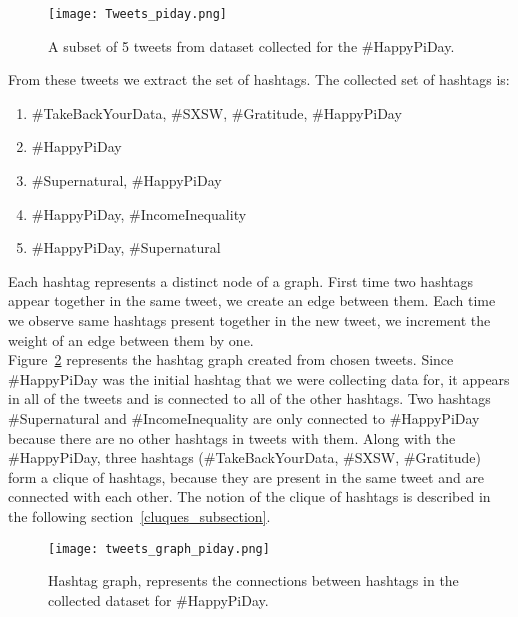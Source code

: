 \documentclass[journal, a4paper, 12pt]{article}
\begin{document}
  \begin{figure}[!hbt]
            \begin{center}
            \texttt{[image: Tweets\_piday.png]}
            \caption{A subset of 5 tweets from dataset collected for the \#HappyPiDay.}
            \label{fig:tweets_piday}
            \end{center}
      \end{figure}
    
From these tweets we extract the set of hashtags. The collected set of hashtags is:

\begin{enumerate}
\item \#TakeBackYourData, \#SXSW, \#Gratitude, \#HappyPiDay
\item \#HappyPiDay
\item \#Supernatural, \#HappyPiDay
\item \#HappyPiDay, \#IncomeInequality
\item \#HappyPiDay, \#Supernatural
\end{enumerate}


Each hashtag represents a distinct node of a graph. First time two hashtags appear together in the same tweet, we create an edge between them. Each time we observe same hashtags present together in the new tweet, we increment the weight of an edge between them by one.
\\

Figure~\ref{fig:tweets_graph_piday.png} represents the hashtag graph created from chosen tweets. Since \#HappyPiDay was the initial hashtag that we were collecting data for, it appears in all of the tweets and is connected to all of the other hashtags. Two hashtags \#Supernatural and \#IncomeInequality are only connected to \#HappyPiDay because there are no other hashtags in tweets with them. Along with the \#HappyPiDay, three hashtags (\#TakeBackYourData, \#SXSW, \#Gratitude) form a clique of hashtags, because they are present in the same tweet and are connected with each other. The notion of the clique of hashtags is described in the following section~\ref{cluques_subsection}.

    
        \begin{figure}[!hbt]
            \begin{center}
            \texttt{[image: tweets\_graph\_piday.png]}
            \caption{Hashtag graph, represents the connections between hashtags in the collected dataset for \#HappyPiDay.}
            \label{fig:tweets_graph_piday.png}
            \end{center}
      \end{figure}
\end{document}
